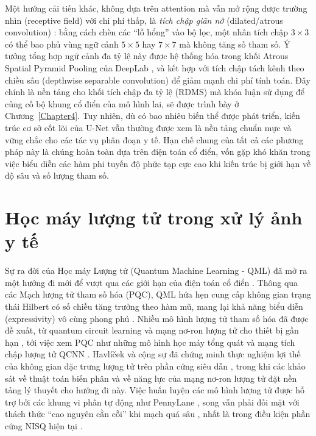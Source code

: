 Một hướng cải tiến khác, không dựa trên attention mà vẫn mở rộng được trường nhìn (receptive field) với chi phí thấp, là \emph{tích chập giãn nở} (dilated/atrous convolution) \cite{yu2016dilated}: bằng cách chèn các ``lỗ hổng'' vào bộ lọc, một nhân tích chập $3\times 3$ có thể bao phủ vùng ngữ cảnh $5\times 5$ hay $7\times 7$ mà không tăng số tham số. Ý tưởng tổng hợp ngữ cảnh đa tỷ lệ này được hệ thống hóa trong khối Atrous Spatial Pyramid Pooling của DeepLab \cite{chen2018deeplabv3plus}, và kết hợp với tích chập tách kênh theo chiều sâu (depthwise separable convolution) \cite{chollet2017xception} để giảm mạnh chi phí tính toán. Đây chính là nền tảng cho khối tích chập đa tỷ lệ (RDMS) mà khóa luận sử dụng để củng cố bộ khung cổ điển của mô hình lai, sẽ được trình bày ở Chương~\ref{Chapter4}. Tuy nhiên, dù có bao nhiêu biến thể được phát triển, kiến trúc cơ sở cốt lõi của U-Net vẫn thường được xem là nền tảng chuẩn mực và vững chắc cho các tác vụ phân đoạn y tế. Hạn chế chung của tất cả các phương pháp này là chúng hoàn toàn dựa trên điện toán cổ điển, vốn gặp khó khăn trong việc biểu diễn các hàm phi tuyến độ phức tạp cực cao khi kiến trúc bị giới hạn về độ sâu và số lượng tham số.

\section{Học máy lượng tử trong xử lý ảnh y tế}
Sự ra đời của Học máy Lượng tử (Quantum Machine Learning - QML) đã mở ra một hướng đi mới để vượt qua các giới hạn của điện toán cổ điển \cite{biamonte2017qml, schuld2015introqml}. Thông qua các Mạch lượng tử tham số hóa (PQC), QML hứa hẹn cung cấp không gian trạng thái Hilbert có số chiều tăng trưởng theo hàm mũ, mang lại khả năng biểu diễn (expressivity) vô cùng phong phú \cite{du2025qmltutorial, schuld2019featurehilbert}. Nhiều mô hình lượng tử tham số hóa đã được đề xuất, từ quantum circuit learning \cite{mitarai2018qcl} và mạng nơ-ron lượng tử cho thiết bị gần hạn \cite{farhi2018qnn}, tới việc xem PQC như những mô hình học máy tổng quát \cite{benedetti2019pqc} và mạng tích chập lượng tử QCNN \cite{cong2019qcnn}. Havl{\'i}{\v{c}}ek và cộng sự đã chứng minh thực nghiệm lợi thế của không gian đặc trưng lượng tử trên phần cứng siêu dẫn \cite{havlicek2019supervised}, trong khi các khảo sát về thuật toán biến phân \cite{cerezo2021vqa} và về năng lực của mạng nơ-ron lượng tử \cite{abbas2021power} đặt nền tảng lý thuyết cho hướng đi này. Việc huấn luyện các mô hình lượng tử được hỗ trợ bởi các khung vi phân tự động như PennyLane \cite{bergholm2018pennylane}, song vẫn phải đối mặt với thách thức ``cao nguyên cằn cỗi'' khi mạch quá sâu \cite{mcclean2018barren}, nhất là trong điều kiện phần cứng NISQ hiện tại \cite{preskill2018nisq}.

